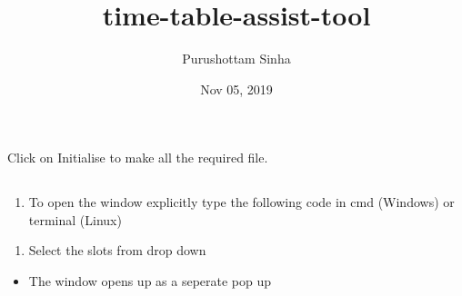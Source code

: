 \documentclass[letterpaper,10pt,english]{sphinxmanual}
\title{time-table-assist-tool}
\date{Nov 05, 2019}
\author{Purushottam Sinha}
\begin{document}
\pagestyle{empty}
\sphinxmaketitle
\pagestyle{plain}
\sphinxtableofcontents
\pagestyle{normal}
\label{\detokenize{index::doc}}



\chapter{}
\label{\detokenize{user_manual:user-manual}}\label{\detokenize{user_manual::doc}}

\section{}
\label{\detokenize{user_manual:working-in-gui-1}}

Click on Initialise to make all the required file.



\section{}
\label{\detokenize{user_manual:id1}}

\subsection{}
\label{\detokenize{user_manual:steps}}
\begin{enumerate}
%
\item {} 
To open the window explicitly type the following code in cmd (Windows) or terminal (Linux)

\end{enumerate}

\begin{sphinxVerbatim}[commandchars=\\\{\}]
 
\end{sphinxVerbatim}
\begin{enumerate}
%
\setcounter{enumi}{1}
\item {} 
Select the slots from drop down

\end{enumerate}
\begin{itemize}
\item {} 
The window opens up as a seperate pop up

\end{itemize}
\end{document}
